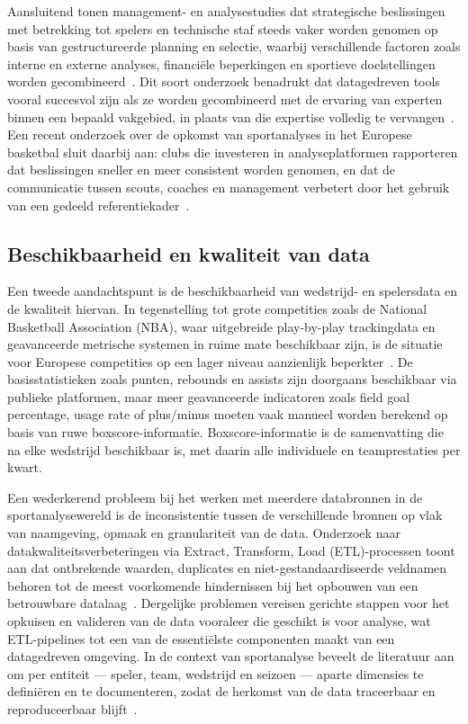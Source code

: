 Aansluitend tonen management- en analysestudies dat strategische beslissingen met
betrekking tot spelers en technische staf steeds vaker worden genomen op basis van
gestructureerde planning en selectie, waarbij verschillende factoren zoals interne en
externe analyses, financiële beperkingen en sportieve doelstellingen worden
gecombineerd~\autocite{banucha2025strategic}. Dit soort onderzoek benadrukt dat
datagedreven tools vooral succesvol zijn als ze worden gecombineerd met de ervaring
van experten binnen een bepaald vakgebied, in plaats van die expertise volledig te
vervangen~\autocite{banucha2025strategic}. Een recent onderzoek over de opkomst van
sportanalyses in het Europese basketbal sluit daarbij aan: clubs die investeren in
analyseplatformen rapporteren dat beslissingen sneller en meer consistent worden
genomen, en dat de communicatie tussen scouts, coaches en management verbetert
door het gebruik van een gedeeld referentiekader~\autocite{eurobasket2026}.

\subsection{Beschikbaarheid en kwaliteit van data}%
\label{subsec:databeschikbaarheid}

Een tweede aandachtspunt is de beschikbaarheid van wedstrijd- en spelersdata en
de kwaliteit hiervan. In tegenstelling tot grote competities zoals de National
Basketball Association (NBA), waar uitgebreide play-by-play trackingdata en
geavanceerde metrische systemen in ruime mate beschikbaar zijn, is de situatie voor
Europese competities op een lager niveau aanzienlijk beperkter~\autocite{dehesa2019key}.
De basisstatistieken zoals punten, rebounds en assists zijn doorgaans beschikbaar
via publieke platformen, maar meer geavanceerde indicatoren zoals field goal
percentage, usage rate of plus/minus moeten vaak manueel worden berekend op
basis van ruwe boxscore-informatie. Boxscore-informatie is de samenvatting die na
elke wedstrijd beschikbaar is, met daarin alle individuele en teamprestaties per
kwart.

Een wederkerend probleem bij het werken met meerdere databronnen in de
sportanalysewereld is de inconsistentie tussen de verschillende bronnen op vlak van
naamgeving, opmaak en granulariteit van de data. Onderzoek naar
datakwaliteitsverbeteringen via Extract, Transform, Load (ETL)-processen toont aan
dat ontbrekende waarden, duplicates en niet-gestandaardiseerde veldnamen behoren
tot de meest voorkomende hindernissen bij het opbouwen van een betrouwbare
datalaag~\autocite{Meegle2026}. Dergelijke problemen vereisen gerichte stappen voor
het opkuisen en valideren van de data vooraleer die geschikt is voor analyse, wat
ETL-pipelines tot een van de essentiëlste componenten maakt van een datagedreven
omgeving. In de context van sportanalyse beveelt de literatuur aan om per entiteit
--- speler, team, wedstrijd en seizoen --- aparte dimensies te definiëren en te
documenteren, zodat de herkomst van de data traceerbaar en reproduceerbaar
blijft~\autocite{Meegle2026}.

